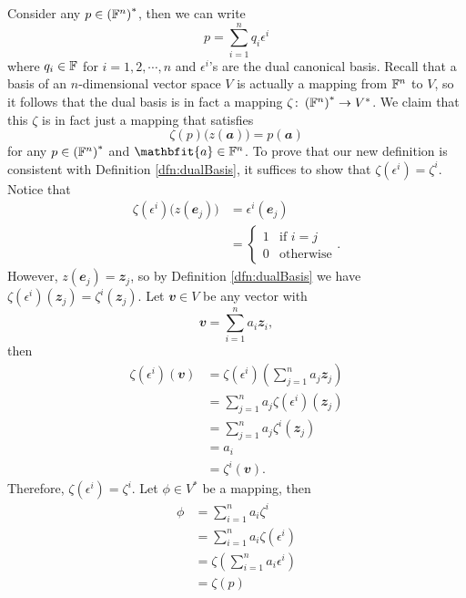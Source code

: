 \documentclass[math]{amznotes}
\theoremstyle{remark}
\begin{document}
Consider any $p \in \left(\mathbb{F}^n\right)^*$, then we can write
\begin{equation*}
    p = \sum_{i = 1}^{n}q_i\epsilon^i
\end{equation*} 
where $q_i \in \mathbb{F}$ for $i = 1, 2, \cdots, n$ and $\epsilon^i$'s are the dual canonical basis. Recall that a basis of an $n$-dimensional vector space $V$ is actually a mapping from $\mathbb{F}^n$ to $V$, so it follows that the dual basis is in fact a mapping $\zeta \colon \left(\mathbb{F}^n\right)^* \to V^*$. We claim that this $\zeta$ is in fact just a mapping that satisfies 
\begin{equation*}
    \zeta(p)\bigl(z(\mathbfit{a})\bigr) = p(\mathbfit{a})
\end{equation*}
for any $p \in \left(\mathbb{F}^n\right)^*$ and $\mathbfit{a} \in \F^n$. To prove that our new definition is consistent with Definition \ref{dfn:dualBasis}, it suffices to show that $\zeta(\epsilon^i) = \zeta^i$. Notice that
\begin{align*}
    \zeta(\epsilon^i)\bigl(z(\mathbfit{e}_j)\bigr) & = \epsilon^i(\mathbfit{e}_j) \\
    & = \begin{cases}
        1 & \textrm{if } i = j \\
        0 & \textrm{otherwise}
    \end{cases}.
\end{align*}
However, $z(\mathbfit{e}_j) = \mathbfit{z}_j$, so by Definition \ref{dfn:dualBasis} we have $\zeta(\epsilon^i)(\mathbfit{z}_j) = \zeta^i(\mathbfit{z}_j)$. Let $\mathbfit{v} \in V$ be any vector with
\begin{equation*}
    \mathbfit{v} = \sum_{i = 1}^{n}a_i\mathbfit{z}_i,
\end{equation*}
then 
\begin{align*}
    \zeta(\epsilon^i)(\mathbfit{v}) & = \zeta(\epsilon^i)\left(\sum_{j = 1}^{n}a_j\mathbfit{z}_j\right) \\
    & = \sum_{j = 1}^{n}a_j\zeta(\epsilon^i)(\mathbfit{z}_j) \\
    & = \sum_{j = 1}^{n}a_j\zeta^i(\mathbfit{z}_j) \\
    & = a_i \\
    & = \zeta^i(\mathbfit{v}).
\end{align*}
Therefore, $\zeta(\epsilon^i) = \zeta^i$. Let $\phi \in V^*$ be a mapping, then
\begin{align*}
    \phi & = \sum_{i = 1}^{n}a_i\zeta^i \\
    & = \sum_{i = 1}^{n}a_i\zeta(\epsilon^i) \\
    & = \zeta\left(\sum_{i = 1}^{n}a_i\epsilon^i\right) \\
    & = \zeta(p)
\end{align*}
\end{document}

